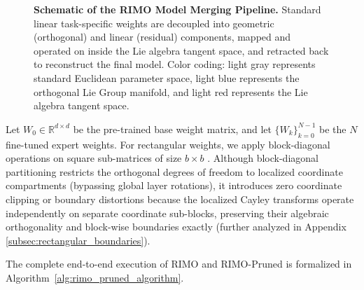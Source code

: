\begin{figure}[ht]
\caption{\textbf{Schematic of the RIMO Model Merging Pipeline.} Standard linear task-specific weights are decoupled into geometric (orthogonal) and linear (residual) components, mapped and operated on inside the Lie algebra tangent space, and retracted back to reconstruct the final model. Color coding: light gray represents standard Euclidean parameter space, light blue represents the orthogonal Lie Group manifold, and light red represents the Lie algebra tangent space.}
\label{fig:pipeline_schematic}
\vskip -0.1in
\end{figure}

Let $W_0 \in \mathbb{R}^{d \times d}$ be the pre-trained base weight matrix, and let $\{W_k\}_{k=0}^{N-1}$ be the $N$ fine-tuned expert weights. For rectangular weights, we apply block-diagonal operations on square sub-matrices of size $b \times b$ \cite{oft2023, yang2026orthomerge}. Although block-diagonal partitioning restricts the orthogonal degrees of freedom to localized coordinate compartments (bypassing global layer rotations), it introduces zero coordinate clipping or boundary distortions because the localized Cayley transforms operate independently on separate coordinate sub-blocks, preserving their algebraic orthogonality and block-wise boundaries exactly (further analyzed in Appendix \ref{subsec:rectangular_boundaries}).

The complete end-to-end execution of RIMO and RIMO-Pruned is formalized in Algorithm~\ref{alg:rimo_pruned_algorithm}.

